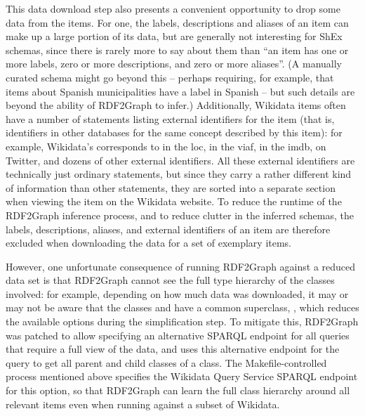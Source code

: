 This data download step also presents a convenient opportunity to drop some data from the items.
For one, the labels, descriptions and aliases of an item can make up a large portion of its data,
but are generally not interesting for ShEx schemas,
since there is rarely more to say about them than
“an item has one or more labels, zero or more descriptions, and zero or more aliases”. %
(A manually curated schema might go beyond this –
perhaps requiring, for example, that items about Spanish municipalities have a label in Spanish –
but such details are beyond the ability of RDF2Graph to infer.)
Additionally, Wikidata items often have a number of statements listing external identifiers for the item
(that is, identifiers in other databases for the same concept described by this item):
for example, Wikidata’s  corresponds to  in the \gls{loc},
 in the \gls{viaf},
 in the \gls{imdb},
 on Twitter,
and dozens of other external identifiers. %
All these external identifiers are technically just ordinary statements,
but since they carry a rather different kind of information than other statements,
they are sorted into a separate section when viewing the item on the Wikidata website.
To reduce the runtime of the RDF2Graph inference process,
and to reduce clutter in the inferred schemas,
the labels, descriptions, aliases, and external identifiers of an item
are therefore excluded when downloading the data for a set of exemplary items.

However, one unfortunate consequence of running RDF2Graph against a reduced data set
is that RDF2Graph cannot see the full type hierarchy of the classes involved:
for example, depending on how much data was downloaded,
it may or may not be aware that the classes  and 
have a common superclass, ,
which reduces the available options during the simplification step. %
To mitigate this, RDF2Graph was patched %
to allow specifying an alternative SPARQL endpoint for all queries that require a full view of the data,
and uses this alternative endpoint for the query to get all parent and child classes of a class.
The Makefile-controlled process mentioned above %
specifies the Wikidata Query Service SPARQL endpoint for this option,
so that RDF2Graph can learn the full class hierarchy around all relevant items %
even when running against a subset of Wikidata. %

